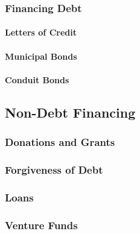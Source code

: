 

\subsubsection{Financing Debt}\indent%
\label{sec:financing_debt}

\paragraph{Letters of Credit}
\paragraph{Municipal Bonds}
\paragraph{Conduit Bonds}

\subsection{Non-Debt Financing}\indent%
\label{sec:non_debt_financing}

\subsubsection{Donations and Grants}\indent%
\label{sec:donations_grants}

\subsubsection{Forgiveness of Debt}\indent%
\label{sec:forgiveness_debt}

\subsubsection{Loans}\indent%
\label{sec:loans}

\subsubsection{Venture Funds}\indent%
\label{sec:venture_funds}


